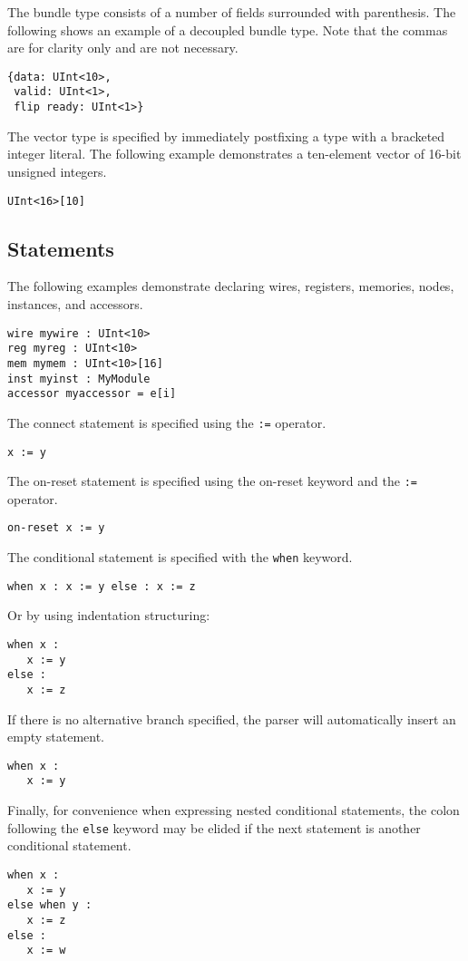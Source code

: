 \documentclass[12pt]{article}
\begin{document}
The bundle type consists of a number of fields surrounded with parenthesis.
The following shows an example of a decoupled bundle type.
Note that the commas are for clarity only and are not necessary.
\begin{verbatim}
{data: UInt<10>,
 valid: UInt<1>,
 flip ready: UInt<1>} 
\end{verbatim}

The vector type is specified by immediately postfixing a type with a bracketed integer literal.
The following example demonstrates a ten-element vector of 16-bit unsigned integers.
\begin{verbatim}
UInt<16>[10]
\end{verbatim}

\subsection*{Statements}
The following examples demonstrate declaring wires, registers, memories, nodes, instances, and accessors. 
\begin{verbatim}
wire mywire : UInt<10>
reg myreg : UInt<10>
mem mymem : UInt<10>[16]
inst myinst : MyModule
accessor myaccessor = e[i]
\end{verbatim}

The connect statement is specified using the \verb|:=| operator.
\begin{verbatim}
x := y
\end{verbatim}

The on-reset statement is specified using the on-reset keyword and  the \verb|:=| operator.
\begin{verbatim}
on-reset x := y
\end{verbatim}

The conditional statement is specified with the \verb|when| keyword.
\begin{verbatim}
when x : x := y else : x := z
\end{verbatim}
Or by using indentation structuring:
\begin{verbatim}
when x :
   x := y
else :
   x := z
\end{verbatim}

If there is no alternative branch specified, the parser will automatically insert an empty statement.
\begin{verbatim}
when x :
   x := y
\end{verbatim}

Finally, for convenience when expressing nested conditional statements, the colon following the \verb|else| keyword may be elided if the next statement is another conditional statement.
\begin{verbatim}
when x :
   x := y
else when y :
   x := z
else :
   x := w
\end{verbatim}
\end{document}
